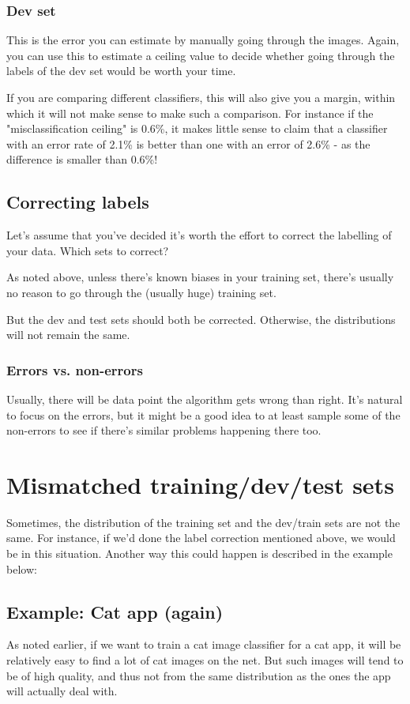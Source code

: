 \documentclass[12pt, a4paper]{article}
\numberwithin{equation}{section}
\begin{document}
\subsubsection{Dev set}
This is the error you can estimate by manually going through the images. Again, you can use this to estimate a ceiling value to decide whether going through the labels of the dev set would be worth your time.

If you are comparing different classifiers, this will also give you a margin, within which it will not make sense to make such a comparison. For instance if the "misclassification ceiling" is 0.6\%, it makes little sense to claim that a classifier with an error rate of 2.1\% is better than one with an error of 2.6\% - as the difference is smaller than 0.6\%!

\subsection{Correcting labels}
Let's assume that you've decided it's worth the effort to correct the labelling of your data. Which sets to correct?

As noted above, unless there's known biases in your training set, there's usually no reason to go through the (usually huge) training set.

But the dev and test sets should both be corrected. Otherwise, the distributions will not remain the same.

\subsubsection{Errors vs. non-errors}
Usually, there will be data point the algorithm gets wrong than right. It's natural to focus on the errors, but it might be a good idea to at least sample some of the non-errors to see if there's similar problems happening there too.

\section{Mismatched training/dev/test sets}
Sometimes, the distribution of the training set and the dev/train sets are not the same. For instance, if we'd done the label correction mentioned above, we would be in this situation. Another way this could happen is described in the example below:

\subsection{Example: Cat app (again)}
As noted earlier, if we want to train a cat image classifier for a cat app, it will be relatively easy to find a lot of cat images on the net. But such images will tend to be of high quality, and thus not from the same distribution as the ones the app will actually deal with.
\end{document}
